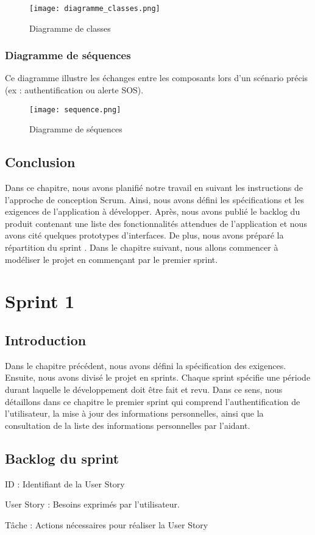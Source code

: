 \documentclass[12pt,a4paper]{report}
\begin{document}
\begin{figure}[H] 
    \centering
    \texttt{[image: diagramme\_classes.png]}
    \caption{Diagramme de classes }
    \label{fig:classe}
\end{figure}


\subsection{Diagramme de séquences}

Ce diagramme illustre les échanges entre les composants lors d’un scénario précis (ex : authentification ou alerte SOS).
 
\begin{figure}[H] 
    \centering
    \texttt{[image: sequence.png]}
    \caption{Diagramme de séquences}
    \label{fig:sequence}
\end{figure}
\section{Conclusion}
Dans ce chapitre, nous avons planifié notre travail en suivant les instructions de l'approche de conception Scrum. Ainsi, nous avons défini les spécifications et les exigences de l’application à développer. Après, nous avons publié le backlog du produit contenant une liste des fonctionnalités attendues de l’application et nous avons cité quelques prototypes d’interfaces. De plus, nous avons préparé la répartition du sprint . Dans le chapitre suivant, nous allons commencer à modéliser le projet en commençant par le premier sprint. 
\chapter{Sprint 1}

\section{Introduction}

Dans le chapitre précédent, nous avons défini la spécification des exigences. Ensuite, nous avons divisé le projet en sprints. Chaque sprint spécifie une période durant laquelle le développement doit être fait et revu. Dans ce sens, nous détaillons dans ce chapitre le premier sprint qui comprend  l’authentification de l’utilisateur, la mise à jour des informations personnelles, ainsi que la consultation de la liste des informations personnelles par l’aidant.
\section{Backlog du sprint}
\item ID : Identifiant de la User Story
\item User Story : Besoins exprimés par l’utilisateur.
\item Tâche : Actions nécessaires pour réaliser la User Story 
\end{document}
